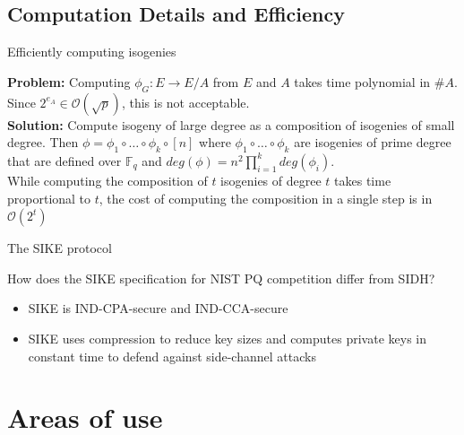 \documentclass{beamer}
\begin{document}
\subsection{Computation Details and Efficiency}

\begin{frame}{Efficiently computing isogenies}


	\textbf{Problem:} Computing $\phi_G : E \to E/A$ from $E$ and $A$ takes time polynomial in $\#A$. Since $2^{e_A} \in \mathcal{O}(\sqrt{p})$, this is not acceptable.\pause\\
	\vfill
	\textbf{Solution:} Compute isogeny of large degree as a composition of isogenies of small degree. Then $\phi = \phi_1 \circ \dots \circ \phi_k \circ [n]$ where $\phi_1 \circ \dots \circ \phi_k$ are isogenies of prime degree that are defined over $\mathbb{F}_q$ and $deg(\phi) = n^2 \prod^k_{i=1} deg(\phi_i)$.\\
	 While computing the composition of $t$ isogenies of degree $t$ takes time proportional to $t$, the cost of computing the composition in a single step is in $\mathcal{O}(2^t)$\\
	 

\end{frame}
\begin{frame}{The SIKE protocol}

How does the SIKE specification for NIST PQ competition differ from SIDH?

\begin{itemize}[\textbullet]
	\item SIKE is IND-CPA-secure and IND-CCA-secure %
	\item SIKE uses compression to reduce key sizes and computes private keys in constant time to defend against side-channel attacks
\end{itemize}

\end{frame}
\section{Areas of use}
\end{document}
